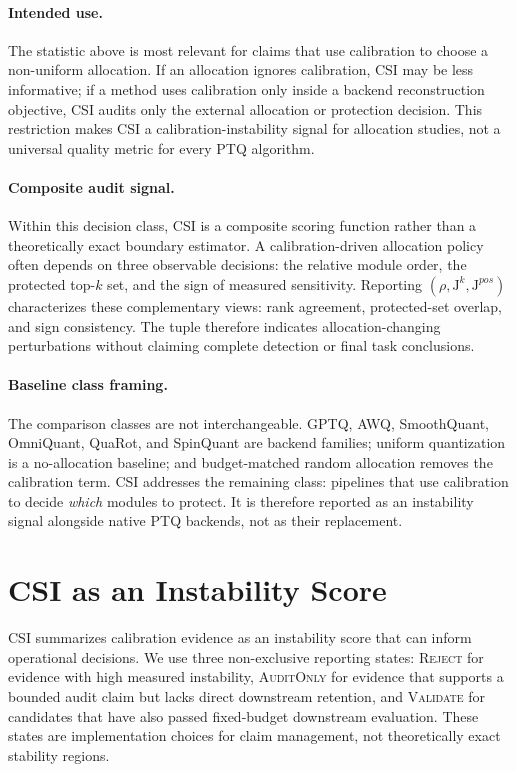 \documentclass[letterpaper]{article}
\newcommand{\Jacc}{\mathrm{J}}
\begin{document}
\paragraph{Intended use.}
The statistic above is most relevant for claims that use calibration to choose a
non-uniform allocation. If an allocation ignores calibration, CSI may be less
informative; if a method uses calibration only inside a backend reconstruction
objective, CSI audits only the external allocation or protection decision. This
restriction makes CSI a calibration-instability signal for allocation studies,
not a universal quality metric for every PTQ algorithm.

\paragraph{Composite audit signal.}
Within this decision class, CSI is a composite scoring function rather than a
theoretically exact boundary estimator. A calibration-driven allocation policy
often depends on three observable decisions: the relative module order, the
protected top-$k$ set, and the sign of measured sensitivity. Reporting
$(\rho,\Jacc^k,\Jacc^{pos})$ characterizes these complementary views: rank
agreement, protected-set overlap, and sign consistency. The tuple therefore
indicates allocation-changing perturbations without claiming complete detection
or final task conclusions.

\paragraph{Baseline class framing.}
The comparison classes are not interchangeable. GPTQ, AWQ, SmoothQuant,
OmniQuant, QuaRot, and SpinQuant are backend families; uniform quantization is a
no-allocation baseline; and budget-matched random allocation removes the
calibration term. CSI addresses the remaining class: pipelines that use
calibration to decide \emph{which} modules to protect. It is therefore reported
as an instability signal alongside native PTQ backends, not as their
replacement.

\section{CSI as an Instability Score}

CSI summarizes calibration evidence as an instability score that can inform
operational decisions. We use three non-exclusive reporting states:
\textsc{Reject} for evidence with high measured instability, \textsc{AuditOnly}
for evidence that supports a bounded audit claim but lacks direct downstream
retention, and \textsc{Validate} for candidates that have also passed
fixed-budget downstream evaluation. These states are implementation choices for
claim management, not theoretically exact stability regions.
\end{document}
